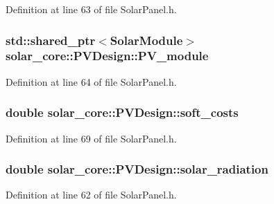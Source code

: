 Definition at line 63 of file Solar\+Panel.\+h.

\hypertarget{classsolar__core_1_1_p_v_design_a89f2b59847de64cab26b56f21ace4e6c}{}
\subsubsection[{P\+V\+\_\+module}]{\setlength{\rightskip}{0pt plus 5cm}std\+::shared\+\_\+ptr$<${\bf Solar\+Module}$>$ solar\+\_\+core\+::\+P\+V\+Design\+::\+P\+V\+\_\+module}\label{classsolar__core_1_1_p_v_design_a89f2b59847de64cab26b56f21ace4e6c}


Definition at line 64 of file Solar\+Panel.\+h.

\hypertarget{classsolar__core_1_1_p_v_design_ac1220011d65d7cc442cd143f93123f31}{}
\subsubsection[{soft\+\_\+costs}]{\setlength{\rightskip}{0pt plus 5cm}double solar\+\_\+core\+::\+P\+V\+Design\+::soft\+\_\+costs}\label{classsolar__core_1_1_p_v_design_ac1220011d65d7cc442cd143f93123f31}


Definition at line 69 of file Solar\+Panel.\+h.

\hypertarget{classsolar__core_1_1_p_v_design_a1a20c72743528802ed5498fe848559df}{}
\subsubsection[{solar\+\_\+radiation}]{\setlength{\rightskip}{0pt plus 5cm}double solar\+\_\+core\+::\+P\+V\+Design\+::solar\+\_\+radiation}\label{classsolar__core_1_1_p_v_design_a1a20c72743528802ed5498fe848559df}


Definition at line 62 of file Solar\+Panel.\+h.

\hypertarget{classsolar__core_1_1_p_v_design_ac015f1cf090279e45861f2860f008cc2}{}
